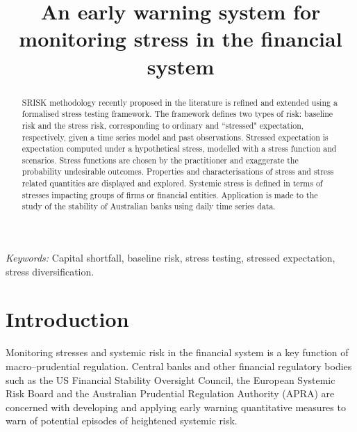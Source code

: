 \documentclass[authoryear]{elsarticle}
\begin{document}
\title{An early warning system for monitoring  stress in the financial system}


\begin{abstract}
SRISK methodology recently proposed in the literature is refined and extended using a formalised stress testing framework.  The framework defines two types of risk:  baseline risk and the stress risk, corresponding to ordinary and ``stressed" expectation, respectively, given a time series model and past observations.   Stressed expectation is expectation computed  under a hypothetical  stress, modelled with a stress function and scenarios.   Stress functions are chosen by the practitioner and  exaggerate the probability undesirable  outcomes.    Properties and characterisations of stress and stress related quantities are displayed and explored.  Systemic stress is defined in terms of stresses   impacting groups of firms or financial entities.    Application is made to the study of the stability of Australian banks using daily time series data.
\end{abstract}

\date{}
\maketitle
\noindent
{\it Keywords:}  Capital shortfall, baseline risk, stress testing,  stressed expectation, stress diversification.


\newpage

\section{Introduction}\label{intro}
Monitoring stresses and systemic risk in the financial system is a key function of macro--prudential regulation. Central banks and other financial regulatory bodies such as the US Financial Stability Oversight Council, the European Systemic Risk Board and the Australian Prudential Regulation Authority (APRA) are concerned with developing and applying early warning quantitative  measures  to warn of potential episodes of heightened systemic risk. 
\end{document}
